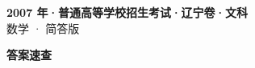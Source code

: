 \documentclass[zihao=-4, a4paper]{ctexart}
\begin{document}
\begin{center}
  {\Large\bfseries 2007 年·普通高等学校招生考试·辽宁卷·文科}\\[4pt]
  {\large 数学 · 简答版}
\end{center}
\medskip
{}

\clearpage
{}
\begin{center}{\Large\bfseries 答案速查}\end{center}
\medskip

\end{document}
